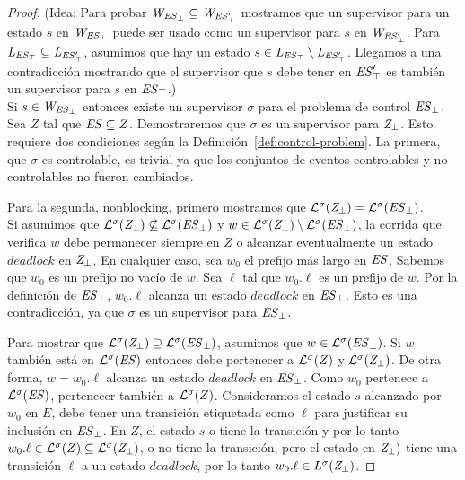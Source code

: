 \begin{proof}
	
(Idea:	Para probar $\mathit{W_{\mathit{\mathit{ES}_{\bot}}}} \subseteq \mathit{W_{\mathit{\mathit{ES}'_{\bot}}}}$ mostramos que un supervisor para un estado $s$ en $\mathit{W_{\mathit{\mathit{ES}_{\bot}}}}$ 
	puede ser usado como un supervisor para $s$ en $\mathit{W_{\mathit{\mathit{ES}'_{\bot}}}}$. Para $\mathit{L_{\mathit{\mathit{ES}_{\top}}}} \subseteq 
	\mathit{L_{\mathit{\mathit{ES}'_{\top}}}}$, asumimos que hay un estado $s \in \mathit{L_{\mathit{\mathit{ES}_{\top}}}} \setminus \mathit{L_{\mathit{\mathit{ES}'_{\top}}}} $. Llegamos a una contradicción mostrando que el supervisor que $s$ debe tener en
	$\mathit{\mathit{ES}'_{\top}}$ es también un supervisor para $s$ en $\mathit{\mathit{ES}_{\top}}$.)\\
	

Si $s \in \mathit{W_{\mathit{\mathit{ES}_{\bot}}}} $ entonces existe un supervisor $\sigma$ para el problema de control $\mathit{\mathit{ES}_{\bot}}$. Sea $Z$ tal que $\mathit{ES} \subseteq Z$. Demostraremos que $\sigma$ es un supervisor para $\mathit{Z_{\bot}}$. Esto requiere dos condiciones según la Definición~\ref{def:control-problem}. La primera, que $\sigma$ es controlable, es trivial ya que los conjuntos de eventos controlables y no controlables no fueron cambiados. 

Para la segunda, nonblocking, primero mostramos que $\mathcal{L}^\sigma(\mathit{Z_{\bot}}) = 
\mathcal{L}^\sigma(\mathit{\mathit{ES}_{\bot}})$. \\

Si asumimos que $\mathcal{L}^\sigma(\mathit{Z_{\bot}}) \not\subseteq \mathcal{L}^\sigma(\mathit{\mathit{ES}_{\bot}})$ y $w \in 
\mathcal{L}^\sigma(\mathit{Z_{\bot}}) \setminus \mathcal{L}^\sigma(\mathit{\mathit{ES}_{\bot}})$, la corrida que verifica $w$ debe permanecer siempre en $Z$ o alcanzar eventualmente un estado $deadlock$ en $\mathit{Z_{\bot}}$. En cualquier caso, sea $w_0$ el prefijo más largo en $\mathit{ES}$. 
Sabemos que $w_0$ es un prefijo no vacío de $w$. Sea $\ell$ tal que $w_0.\ell$ es un prefijo de $w$. 
Por la definición de $\mathit{\mathit{ES}_{\bot}}$, $w_0.\ell$ alcanza un estado $deadlock$ en $\mathit{\mathit{ES}_{\bot}}$. Esto es una contradicción, ya que $\sigma$ es un supervisor para
$\mathit{\mathit{ES}_{\bot}}$. 

Para mostrar que $\mathcal{L}^\sigma(\mathit{Z_{\bot}}) \supseteq \mathcal{L}^\sigma(\mathit{\mathit{ES}_{\bot}})$, asumimos que $w \in \mathcal{L}^\sigma(\mathit{\mathit{ES}_{\bot}})$. Si $w$ también está en $\mathcal{L}^\sigma(\mathit{ES})$ entonces debe pertenecer a $\mathcal{L}^\sigma(Z)$ y $\mathcal{L}^\sigma(\mathit{Z_{\bot}})$. De otra forma, $w = w_0.\ell$ alcanza un estado $deadlock$ en $\mathit{\mathit{ES}_{\bot}}$. Como $w_0$ pertenece a $\mathcal{L}^\sigma(\mathit{ES})$, pertenecer también a $\mathcal{L}^\sigma(Z)$. Consideramos el estado $s$ alcanzado por  $w_0$ en $E$, debe tener una transición etiquetada como $\ell$ para justificar su inclusión en $\mathit{\mathit{ES}_{\bot}}$. En $Z$, el estado $s$ o tiene la transición y por lo tanto $w_0.\ell \in \mathcal{L}^\sigma(Z) \subseteq 
\mathcal{L}^\sigma(\mathit{Z_{\bot}})$, o no tiene la transición, pero el estado en $\mathit{Z_{\bot}})$ tiene una transición $\ell$ a un estado $deadlock$, por lo tanto $w_0.\ell \in 
L^\sigma(\mathit{Z_{\bot}})$.


\end{proof}

